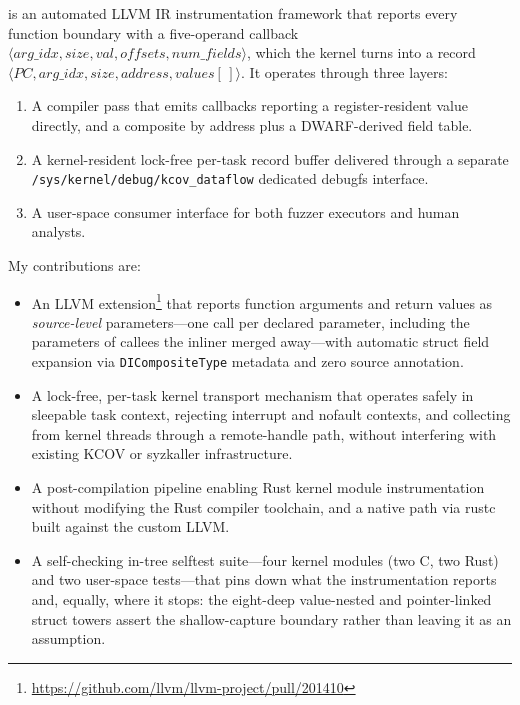 \documentclass{article}
\begin{document}
\toolname{} is an automated LLVM IR instrumentation framework that reports every
function boundary with a five-operand callback
$\langle \mathit{arg\_idx}, \mathit{size}, \mathit{val},
\mathit{offsets}, \mathit{num\_fields} \rangle$,
which the kernel turns into a record
$\langle \mathit{PC}, \mathit{arg\_idx}, \mathit{size},
\mathit{address}, \mathit{values}[\,] \rangle$.
It operates through three layers:
\begin{enumerate}[nosep]
  \item A compiler pass that emits callbacks reporting a register-resident
        value directly, and a composite by address plus a DWARF-derived field
        table.
  \item A kernel-resident lock-free per-task record buffer delivered through a
        separate \texttt{/sys/kernel/debug/kcov\_dataflow} dedicated debugfs interface.
  \item A user-space consumer interface for both fuzzer executors and human
        analysts.
\end{enumerate}

My contributions are:
\begin{itemize}[nosep]
  \item An LLVM \sancov extension\footnote{\url{https://github.com/llvm/llvm-project/pull/201410}} that reports function arguments and return
        values as \emph{source-level} parameters---one call per declared
        parameter, including the parameters of callees the inliner merged
        away---with automatic struct field expansion via
        \texttt{DICompositeType} metadata and zero source annotation.
  \item A lock-free, per-task kernel transport mechanism that operates safely in
        sleepable task context, rejecting interrupt and nofault contexts, and
        collecting from kernel threads through a remote-handle path, without
        interfering with existing KCOV or syzkaller infrastructure.
  \item A post-compilation pipeline enabling Rust kernel module instrumentation
        without modifying the Rust compiler toolchain, and a native path via
        rustc built against the custom LLVM.
  \item A self-checking in-tree selftest suite---four kernel modules (two C,
        two Rust) and two user-space tests---that pins down what the
        instrumentation reports and, equally, where it stops: the eight-deep
        value-nested and pointer-linked struct towers assert the shallow-capture
        boundary rather than leaving it as an assumption.
\end{itemize}
\end{document}
